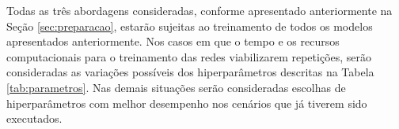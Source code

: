 

Todas as três abordagens consideradas, conforme apresentado anteriormente na Seção \ref{sec:preparacao}, estarão sujeitas ao treinamento de todos os modelos apresentados anteriormente. Nos casos em que o tempo e os recursos computacionais para o treinamento das redes viabilizarem repetições, serão consideradas as variações possíveis dos hiperparâmetros descritas na Tabela \ref{tab:parametros}. Nas demais situações serão consideradas escolhas de hiperparâmetros com melhor desempenho nos cenários que já tiverem sido executados.
